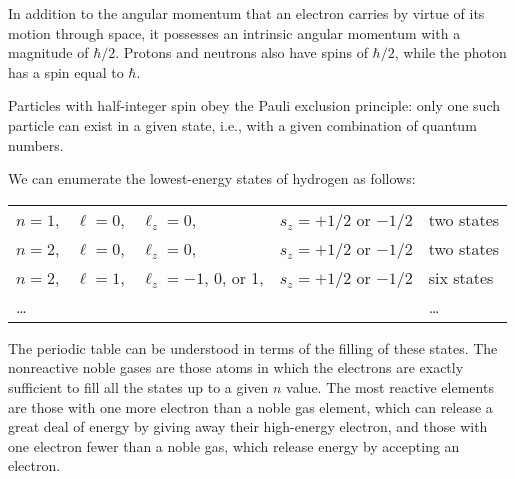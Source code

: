 In addition to the angular momentum that an electron carries
by virtue of its motion through space, it possesses an
intrinsic angular momentum with a magnitude of $\hbar/2$. Protons
and neutrons also have spins of $\hbar/2$, while the photon
has a spin equal to $\hbar$.

Particles with half-integer spin obey the Pauli exclusion
principle: only one such particle can exist in a given
state, i.e., with a given combination of quantum numbers.

We can enumerate the lowest-energy states of hydrogen as follows:

\noindent\begin{tabular}{|llll|l|}
\hline
  $n=1$, & $\ell=0$, & $\ell_z=0$, & $s_z=+1/2$ or $-1/2$ &	two states \\
  $n=2$, & $\ell=0$, & $\ell_z=0$, & $s_z=+1/2$ or $-1/2$ &	two states\\
  $n=2$, & $\ell=1$, & $\ell_z=-1$, 0, or 1, & $s_z=+1/2$ or $-1/2$ &	six states\\
	\ldots & & & & \ldots\\
\hline
\end{tabular}

\noindent The periodic table can be understood in terms of the filling
of these states. The nonreactive noble gases are those atoms
in which the electrons are exactly sufficient to fill all
the states up to a given $n$ value. The most reactive
elements are those with one more electron than a noble gas
element, which can release a great deal of energy by giving
away their high-energy electron, and those with one electron
fewer than a noble gas, which release energy by accepting an electron.
